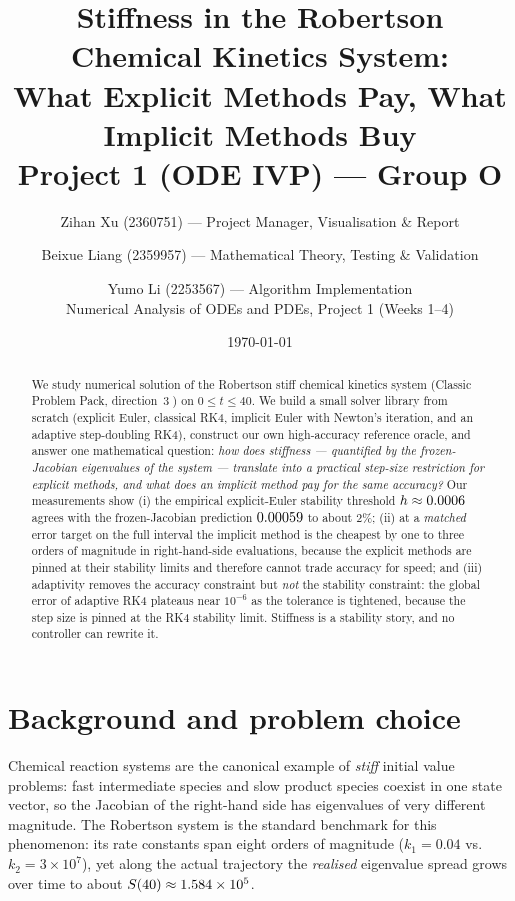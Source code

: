 ﻿\documentclass[11pt,a4paper]{article}
\title{\textbf{Stiffness in the Robertson Chemical Kinetics System:\\
What Explicit Methods Pay, What Implicit Methods Buy}\\[2mm]
\large Project 1 (ODE IVP) --- Group O}
\author{Zihan Xu (2360751) --- Project Manager, Visualisation \& Report \and
Beixue Liang (2359957) --- Mathematical Theory, Testing \& Validation \and
Yumo Li (2253567) --- Algorithm Implementation\\[2pt]
\small Numerical Analysis of ODEs and PDEs, Project 1 (Weeks 1--4)}
\date{\today}
\begin{document}
\maketitle

\begin{abstract}
We study numerical solution of the Robertson stiff chemical kinetics system
(Classic Problem Pack, direction~\textcircled{\scriptsize 3}) on $0\le t\le 40$.  We build a small
solver library from scratch (explicit Euler, classical RK4, implicit Euler with
Newton's iteration, and an adaptive step-doubling RK4), construct our own
high-accuracy reference oracle, and answer one mathematical question:
\emph{how does stiffness --- quantified by the frozen-Jacobian eigenvalues of the
system --- translate into a practical step-size restriction for explicit methods,
and what does an implicit method pay for the same accuracy?}
Our measurements show (i) the empirical explicit-Euler stability threshold
$h\approx0.0006$ agrees with the frozen-Jacobian prediction $0.00059$
to about 2\%; (ii) at a \emph{matched} error target on the full interval the
implicit method is the cheapest by one to three orders of magnitude in
right-hand-side evaluations, because the explicit methods are pinned at their
stability limits and therefore cannot trade accuracy for speed; and
(iii) adaptivity removes the accuracy constraint but \emph{not} the stability
constraint: the global error of adaptive RK4 plateaus near $10^{-6}$ as the
tolerance is tightened, because the step size is pinned at the RK4 stability
limit.  Stiffness is a stability story, and no controller can rewrite it.
\end{abstract}

\tableofcontents

\section{Background and problem choice}
Chemical reaction systems are the canonical example of \emph{stiff} initial
value problems: fast intermediate species and slow product species coexist in
one state vector, so the Jacobian of the right-hand side has eigenvalues of
very different magnitude.  The Robertson system
\cite{robertson1966} is the standard benchmark for this phenomenon: its rate
constants span eight orders of magnitude ($k_1=0.04$ vs.\ $k_2=3\times10^7$),
yet along the actual trajectory the \emph{realised} eigenvalue spread grows
over time to about $S(40)\approx1.584\times10^{5}$.
\end{document}
